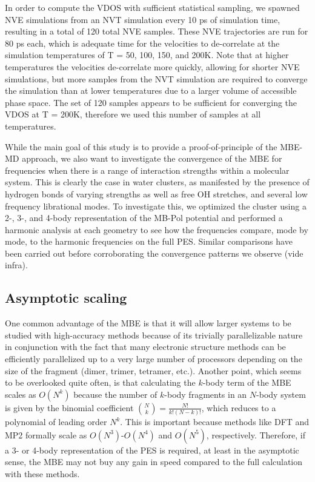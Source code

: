 \documentclass[11pt, proquest]{uwthesis}[2020/02/24]
\let\ce\ch
\begin{document}
\par In order to compute the VDOS with sufficient statistical sampling, we spawned NVE simulations from an NVT simulation every 10 ps of simulation time, resulting in a total of 120 total NVE samples. These NVE trajectories are run for 80 ps each, which is adequate time for the velocities to de-correlate at the simulation temperatures of T = 50, 100, 150, and 200K. Note that at higher temperatures the velocities de-correlate more quickly, allowing for shorter NVE simulations, but more samples from the NVT simulation are required to converge the simulation than at lower temperatures due to a larger volume of accessible phase space. The set of 120 samples appears to be sufficient for converging the VDOS at T = 200K, therefore we used this number of samples at all temperatures.

\par While the main goal of this study is to provide a proof-of-principle of the MBE-MD approach, we also want to investigate the convergence of the MBE for frequencies when there is a range of interaction strengths within a molecular system. This is clearly the case in water clusters, as manifested by the presence of hydrogen bonds of varying strengths as well as free OH stretches, and several low frequency librational modes. To investigate this, we optimized the \ce{(H2O)_{10}} cluster using a 2-, 3-, and 4-body representation of the MB-Pol potential and performed a harmonic analysis at each geometry to see how the frequencies compare, mode by mode, to the harmonic frequencies on the full PES. Similar comparisons have been carried out before\autocite{howard_n-body_2013,he_second-order_2012,sahu_low_2014} corroborating the convergence patterns we observe (vide infra).

\subsection{Asymptotic scaling}

\par One common advantage of the MBE is that it will allow larger systems to be studied with high-accuracy methods because of its trivially parallelizable nature in conjunction with the fact that many electronic structure methods can be efficiently parallelized up to a very large number of processors depending on the size of the fragment (dimer, trimer, tetramer, etc.). Another point, which seems to be overlooked quite often, is that calculating the $k$-body term of the MBE scales as $O(N^k)$ because the number of $k$-body fragments in an $N$-body system is given by the binomial coefficient $\binom{N}{k}=\frac{N!}{k!(N-k)!}$, which reduces to a polynomial of leading order $N^k$. This is important because methods like DFT and MP2 formally scale as $O(N^3)$-$O(N^4)$ and $O(N^5)$, respectively. Therefore, if a 3- or 4-body representation of the PES is required, at least in the asymptotic sense, the MBE may not buy any gain in speed compared to the full calculation with these methods.
\end{document}
